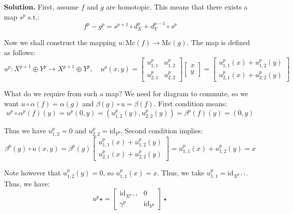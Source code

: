 \documentclass{category-template}
\begin{document}
\textbf{Solution.} First, assume $f$ and $g$ are homotopic. This means 
that there exists a map $s^p$ s.t.:
\begin{equation*}
    f^p - g^p = s^{p+1} \circ d_X^p + d_Y^{p-1} \circ s^p
\end{equation*}

Now we shall construct the mapping $u: \text{Mc}(f) \to \text{Mc}(g)$. The map
is defined as follows:
\begin{equation*}
    u^p: X^{p+1} \oplus Y^{p} \to X^{p+1} \oplus Y^{p}, \quad u^p(x,y) = \begin{bmatrix}
        u^p_{1,1} & u^p_{1,2} \\
        u^p_{2,1} & u^p_{2,2}
    \end{bmatrix}\begin{bmatrix}
        x \\ y
    \end{bmatrix} = \begin{bmatrix}
        u^p_{1,1}(x) + u^p_{1,2}(y) \\
        u^p_{2,1}(x) + u^p_{2,2}(y)
    \end{bmatrix}
\end{equation*}

What do we require from such a map? We need for diagram to commute, so we want
$u \circ \alpha(f) = \alpha(g)$ and $\beta(g) \circ u = \beta(f)$. First condition means:
\begin{equation*}
    u^p \circ \alpha^p(f)(y) = u^p(0,y) = (u^p_{1,2}(y),u^p_{2,2}(y)) = \beta^p(f)(y) = (0, y)
\end{equation*}

Thus we have $u^p_{1,2}=0$ and $u^p_{2,2}=\text{id}_{Y^p}$. Second condition implies:
\begin{equation*}
    \beta^p(g) \circ u(x,y) = \beta^p(g)\begin{bmatrix}
        u^p_{1,1}(x) + u^p_{1,2}(y) \\
        u^p_{2,1}(x) + u^p_{2,2}(y)
    \end{bmatrix} = u^p_{1,1}(x) + u^p_{1,2}(y) = x
\end{equation*}

Note however that $u^p_{1,2}(y) = 0$, so $u^p_{1,1}(x)=x$. Thus, we take 
$u^p_{1,1} = \text{id}_{X^{p+1}}$. Thus, we have:
\begin{equation*}
    u^p \star = \begin{bmatrix}
        \text{id}_{X^{p+1}} & 0 \\
        \gamma^p & \text{id}_{Y^{p}}
    \end{bmatrix}\star
\end{equation*}
\end{document}
